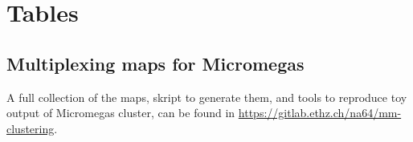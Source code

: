 
\chapter{Tables}

\label{AppendixF}

\section{Multiplexing maps for Micromegas}
\label{sec:multiplex-maps}

A full collection of the maps, skript to generate them, and tools to reproduce toy output of Micromegas cluster, can be found in \url{https://gitlab.ethz.ch/na64/mm-clustering}.

